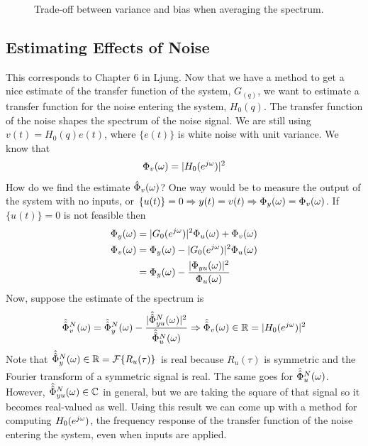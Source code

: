 \begin{figure}[ht!]
  \centering
   \hfill
   \hfill
  \caption{Trade-off between variance and bias when averaging the spectrum.}
  \label{fig:07tradeoff}
\end{figure}

\subsection{Estimating Effects of Noise}
This corresponds to Chapter 6 in Ljung. Now that we have a method to get a nice estimate of the transfer function of the system, $G_(q)$, we want to estimate a transfer function for the noise entering the system, $H_0(q)$. The transfer function of the noise shapes the spectrum of the noise signal. We are still using $v(t) = H_0(q)e(t)$, where $\{e(t)\}$ is white noise with unit variance. We know that
$$\Phi_v(\omega) = |H_0(e^{j\omega})|^2$$
How do we find the estimate $\hat{\Phi}_v(\omega)$? One way would be to measure the output of the system with no inputs, or $\{u(t)\}=0 \Rightarrow y(t) = v(t) \Rightarrow \Phi_y(\omega) = \Phi_v(\omega)$. If $\{u(t)\}=0$ is not feasible then
\begin{align*}
\Phi_y(\omega) &= |G_0(e^{j\omega})|^2\Phi_u(\omega) + \Phi_v(\omega) \\
\Phi_v(\omega) &= \Phi_y(\omega) - |G_0(e^{j\omega})|^2\Phi_u(\omega) \\
&= \Phi_y(\omega) - \frac{|\Phi_{yu}(\omega)|^2}{\Phi_u(\omega)}
\end{align*}
Now, suppose the estimate of the spectrum is
\begin{align*}
\hat{\hat{\Phi}}_v^N(\omega) = \hat{\hat{\Phi}}_y^N(\omega) - \frac{|\hat{\hat{\Phi}}_{yu}^N(\omega)|^2}{\hat{\hat{\Phi}}_u^N(\omega)} \Rightarrow \hat{\hat{\Phi}}_v(\omega)\in\mathbb{R} = |H_0(e^{j\omega})|^2
\end{align*}
Note that $\hat{\hat{\Phi}}_y^N(\omega)\in\mathbb{R} = \mathcal{F}\{R_u(\tau)\}$ is real because $R_u(\tau)$ is symmetric and the Fourier transform of a symmetric signal is real. The same goes for $\hat{\hat{\Phi}}_u^N(\omega)$. However, $\hat{\hat{\Phi}}_{yu}^N(\omega)\in\mathbb{C}$ in general, but we are taking the square of that signal so it becomes real-valued as well. Using this result we can come up with a method for computing $H_0(e^{j\omega})$, the frequency response of the transfer function of the noise entering the system, even when inputs are applied.

